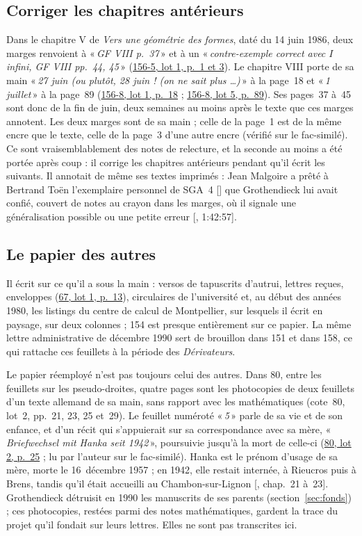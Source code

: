 \documentclass[11pt]{amsart}
\makeatletter
\newcommand{\ts}[1]{\foreignlanguage{english}{#1}}
\newcommand{\q}[1]{«\,\textit{#1}\,»}
\def\RHM@first#1--#2\@nil{#1}
\DeclareRobustCommand{\lot}[3]{\begingroup\edef\RHM@pdfpage{\the\numexpr\RHM@first#3--\@nil+1\relax}\href{https://grothendieck.umontpellier.fr/#1.pdf\#page=\RHM@pdfpage}{#1, lot #2, p.~#3}\endgroup}
\newcommand{\lot}[3]{\href{https://grothendieck.commutator.io/\##1/#2/p#3}{#1, lot #2, p.~#3}}
\makeatother
\begin{document}
\subsection{Corriger les chapitres antérieurs}

Dans le chapitre V de \emph{Vers une géométrie des formes}, daté du 14 juin 1986, deux marges renvoient à \q{GF VIII p.~37} et à un \q{contre-exemple correct avec $I$ infini, GF VIII pp.~44, 45} (\lot{156-5}{1}{1 et 3}). Le chapitre VIII porte de sa main \q{27 juin (ou plutôt, 28 juin ! (on ne sait plus …)} à la page~18 et \q{1 juillet} à la page~89 (\lot{156-8}{1}{18} ; \lot{156-8}{5}{89}). Ses pages~37 à~45 sont donc de la fin de juin, deux semaines au moins après le texte que ces marges annotent. Les deux marges sont de sa main ; celle de la page~1 est de la même encre que le texte, celle de la page~3 d'une autre encre (vérifié sur le fac-similé). Ce sont vraisemblablement des notes de relecture, et la seconde au moins a été portée après coup : il corrige les chapitres antérieurs pendant qu'il écrit les suivants. Il annotait de même ses textes imprimés : Jean Malgoire a prêté à Bertrand Toën l'exemplaire personnel de SGA~4 [\citealp{sga4}] que Grothendieck lui avait confié, couvert de notes au crayon dans les marges, où il signale une généralisation possible ou une petite erreur [\citealp{toen2014}, \ts{1:42:57}].

\subsection{Le papier des autres}\label{sub:papier}

Il écrit sur ce qu'il a sous la main : versos de tapuscrits d'autrui, lettres reçues, enveloppes (\lot{67}{1}{13}), circulaires de l'université et, au début des années 1980, les listings du centre de calcul de Montpellier, sur lesquels il écrit en paysage, sur deux colonnes ; 154 est presque entièrement sur ce papier. La même lettre administrative de décembre 1990 sert de brouillon dans 151 et dans 158, ce qui rattache ces feuillets à la période des \emph{Dérivateurs}.

Le papier réemployé n'est pas toujours celui des autres. Dans 80, entre les feuillets sur les pseudo-droites, quatre pages sont les photocopies de deux feuillets d'un texte allemand de sa main, sans rapport avec les mathématiques (cote~80, lot~2, pp.~21, 23, 25 et~29). Le feuillet numéroté \q{5} parle de sa vie et de son enfance, et d'un récit qui s'appuierait sur sa correspondance avec sa mère, \q{Briefwechsel mit Hanka seit 1942}, poursuivie jusqu'à la mort de celle-ci (\lot{80}{2}{25} ; lu par l'auteur sur le fac-similé). Hanka est le prénom d'usage de sa mère, morte le 16~décembre 1957 ; en 1942, elle restait internée, à Rieucros puis à Brens, tandis qu'il était accueilli au Chambon-sur-Lignon [\citealp{circle-anarchy}, chap.~21 à~23]. Grothendieck détruisit en 1990 les manuscrits de ses parents (section~\ref{sec:fonds}) ; ces photocopies, restées parmi des notes mathématiques, gardent la trace du projet qu'il fondait sur leurs lettres. Elles ne sont pas transcrites ici.
\end{document}

